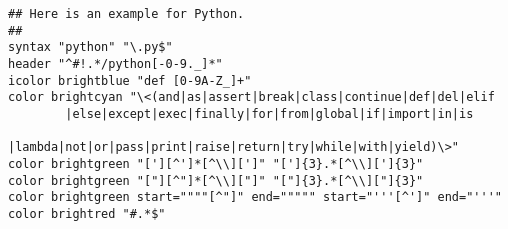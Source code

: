 \begin{framed}
\begin{verbatim}
## Here is an example for Python.
##
syntax "python" "\.py$"
header "^#!.*/python[-0-9._]*"
icolor brightblue "def [0-9A-Z_]+"
color brightcyan "\<(and|as|assert|break|class|continue|def|del|elif
        |else|except|exec|finally|for|from|global|if|import|in|is
        |lambda|not|or|pass|print|raise|return|try|while|with|yield)\>"
color brightgreen "['][^']*[^\\][']" "[']{3}.*[^\\][']{3}"
color brightgreen "["][^"]*[^\\]["]" "["]{3}.*[^\\]["]{3}"
color brightgreen start=""""[^"]" end=""""" start="'''[^']" end="'''"
color brightred "#.*$"

\end{verbatim}
 \end{framed}